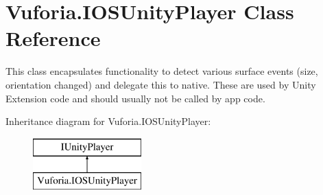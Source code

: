 \hypertarget{class_vuforia_1_1_i_o_s_unity_player}{}\section{Vuforia.\+I\+O\+S\+Unity\+Player Class Reference}
\label{class_vuforia_1_1_i_o_s_unity_player}


This class encapsulates functionality to detect various surface events (size, orientation changed) and delegate this to native. These are used by Unity Extension code and should usually not be called by app code.  


Inheritance diagram for Vuforia.\+I\+O\+S\+Unity\+Player\+:\begin{figure}[H]
\begin{center}
\leavevmode
\includegraphics[height=2.000000cm]{class_vuforia_1_1_i_o_s_unity_player}
\end{center}
\end{figure}
